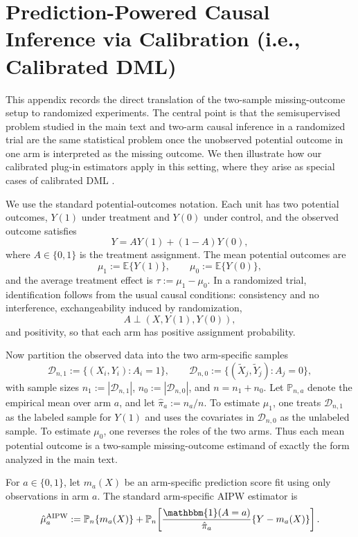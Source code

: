 \documentclass{article}
\theoremstyle{plain}
\theoremstyle{definition}
\newcommand{\E}{\mathbb{E}}
\newcommand{\1}{\mathbbm{1}}
\begin{document}
\section{Prediction-Powered Causal Inference via Calibration (i.e., Calibrated DML)}
\label{app:causal}
This appendix records the direct translation of the two-sample missing-outcome setup to randomized experiments. The central point is that the semisupervised problem studied in the main text and two-arm causal inference in a randomized trial are the same statistical problem once the unobserved potential outcome in one arm is interpreted as the missing outcome. We then illustrate how our calibrated plug-in estimators apply in this setting, where they arise as special cases of calibrated DML \citep{van2024automatic}.

We use the standard potential-outcomes notation. Each unit has two potential outcomes, \(Y(1)\) under treatment and \(Y(0)\) under control, and the observed outcome satisfies
\[
Y=AY(1)+(1-A)Y(0),
\]
where \(A\in\{0,1\}\) is the treatment assignment. The mean potential outcomes are
\[
\mu_1:=\E\{Y(1)\},
\qquad
\mu_0:=\E\{Y(0)\},
\]
and the average treatment effect is \(\tau:=\mu_1-\mu_0\). In a randomized trial, identification follows from the usual causal conditions: consistency and no interference, exchangeability induced by randomization,
\[
A\perp (X,Y(1),Y(0)),
\]
and positivity, so that each arm has positive assignment probability.

Now partition the observed data into the two arm-specific samples
\[
\mathcal D_{n,1}:=\{(X_i,Y_i):A_i=1\},
\qquad
\mathcal D_{n,0}:=\{(\widetilde X_j,\widetilde Y_j):A_j=0\},
\]
with sample sizes \(n_1:=|\mathcal D_{n,1}|\), \(n_0:=|\mathcal D_{n,0}|\), and \(n=n_1+n_0\). Let \(\mathbb P_{n,a}\) denote the empirical mean over arm \(a\), and let \(\hat\pi_a:=n_a/n\). To estimate \(\mu_1\), one treats \(\mathcal D_{n,1}\) as the labeled sample for \(Y(1)\) and uses the covariates in \(\mathcal D_{n,0}\) as the unlabeled sample. To estimate \(\mu_0\), one reverses the roles of the two arms. Thus each mean potential outcome is a two-sample missing-outcome estimand of exactly the form analyzed in the main text.

For \(a\in\{0,1\}\), let \(m_a(X)\) be an arm-specific prediction score fit using only observations in arm \(a\). The standard arm-specific AIPW estimator is
\[
\hat\mu_a^{\mathrm{AIPW}}
:=
\mathbb P_n\{m_a(X)\}
+
\mathbb P_n\!\left[
\frac{\1(A=a)}{\hat\pi_a}\{Y-m_a(X)\}
\right].
\]
\end{document}
